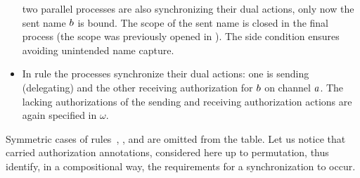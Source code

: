 \begin{itemize}
two parallel processes are also synchronizing their dual actions, only now the sent name $b$ is bound. The scope of the sent name is closed in the final process (the scope was previously opened in ). The side condition ensures avoiding unintended name capture.
\item
In rule   the processes synchronize their dual actions: one is sending (delegating) and the other receiving authorization for $b$ on channel $a$. The lacking authorizations of the sending and receiving authorization actions are again specified in $\omega$. 
\end{itemize}

Symmetric cases of rules~, ,  and  are omitted from the table. Let us notice that carried authorization annotations, considered here up to permutation, thus identify,  in a compositional way, the requirements for a synchronization to occur.

